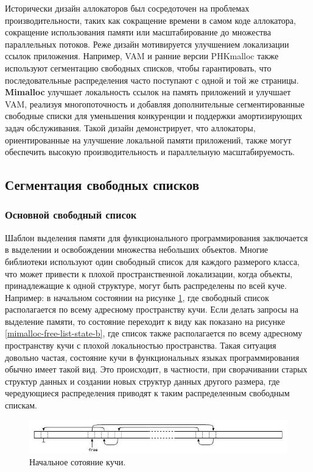 Исторически дизайн аллокаторов был сосредоточен на проблемах производительности, таких как сокращение времени в самом коде аллокатора, сокращение использования памяти или масштабирование до множества параллельных потоков. Реже дизайн мотивируется улучшением локализации ссылок приложения. Например, VAM и ранние версии PHKmalloc также используют сегментацию свободных списков, чтобы гарантировать, что последовательные распределения часто поступают с одной и той же страницы. \textbf{Mimalloc} улучшает локальность ссылок на память приложений и улучшает VAM, реализуя многопоточность и добавляя дополнительные сегментированные свободные списки для уменьшения конкуренции и поддержки амортизирующих задач обслуживания. Такой дизайн демонстрирует, что аллокаторы, ориентированные на улучшение локальной памяти приложений, также могут обеспечить высокую производительность и параллельную масштабируемость.

\subsection{Сегментация свободных списков}
\subsubsection{Основной свободный список}

Шаблон выделения памяти для функционального программирования заключается в выделении и освобождении множества небольших объектов. Многие библиотеки используют один свободный список для каждого размерого класса, что может привести к плохой пространственной локализации, когда объекты, принадлежащие к одной структуре, могут быть распределены по всей куче. Например: в начальном состоянии на рисунке \ref{mimalloc-free-list-state-a}, где свободный список располагается по всему адресному пространству кучи. Если делать запросы на выделение памяти, то состояние переходит к виду как показано на рисунке \ref{mimalloc-free-list-state-b}, где список также располагается по всему адресному пространству кучи с плохой локальностью пространства. Такая ситуация довольно частая, состояние кучи в функциональных языках программирования обычно имеет такой вид. Это происходит, в частности, при сворачивании старых структур данных и создании новых структур данных другого размера, где чередующиеся распределения приводят к таким распределенным свободным спискам.

\begin{figure}[!h]
	\begin{center}
		\includegraphics[scale=0.8]{images/mimalloc-free-list-state-a.jpg}
		\caption{Начальное сотояние кучи.}
		\label{mimalloc-free-list-state-a}
	\end{center}
\end{figure}

